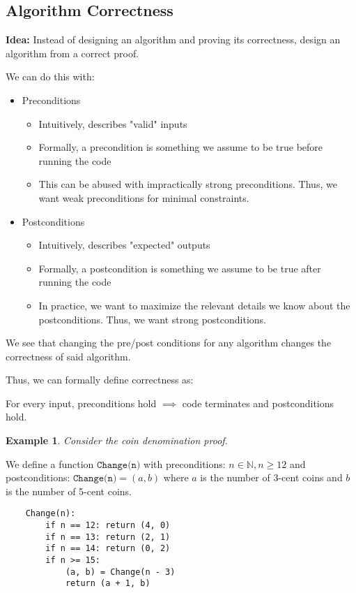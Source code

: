 \documentclass{article}
\newcommand{\N}{\mathbb{N}}
\newtheorem{example}{Example}[section]
\begin{document}
\subsection{Algorithm Correctness}

\textbf{Idea:} Instead of designing an algorithm and proving its correctness, design an algorithm from a correct proof.

We can do this with:
\begin{itemize}
    \item Preconditions
    \begin{itemize}
        \item Intuitively, describes "valid" inputs
        \item Formally, a precondition is something we assume to be true before running the code
        \item This can be abused with impractically strong preconditions. Thus, we want weak preconditions for minimal constraints.
    \end{itemize}
    \item Postconditions
    \begin{itemize}
        \item Intuitively, describes "expected" outputs
        \item Formally, a postcondition is something we assume to be true after running the code
        \item In practice, we want to maximize the relevant details we know about the postconditions. Thus, we want strong postconditions.
    \end{itemize}
\end{itemize}

We see that changing the pre/post conditions for any algorithm changes the correctness of said algorithm.

Thus, we can formally define correctness as:

For every input, preconditions hold $\implies$ code terminates and postconditions hold.

\begin{example}
    Consider the coin denomination proof.
\end{example}

We define a function $\texttt{Change(n)}$ with preconditions: $n \in \N, n \geq 12$ and postconditions: $\texttt{Change(n)} = (a, b)$ where $a$ is the number of 3-cent coins and $b$ is the number of 5-cent coins.

\begin{verbatim}
    Change(n):
        if n == 12: return (4, 0)
        if n == 13: return (2, 1)
        if n == 14: return (0, 2)
        if n >= 15: 
            (a, b) = Change(n - 3)
            return (a + 1, b)
\end{verbatim}
\end{document}

